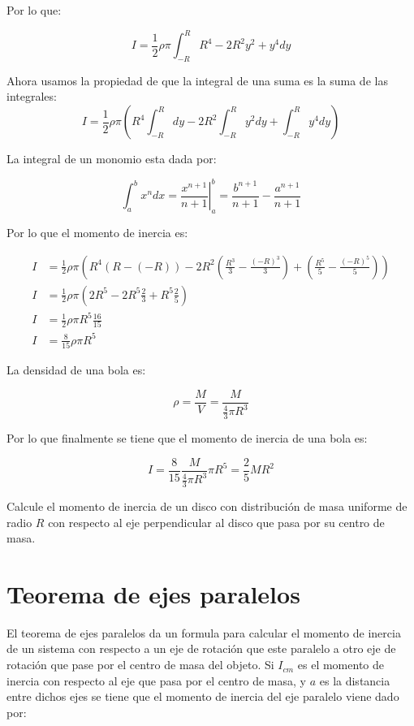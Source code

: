 \documentclass[a4paper,11pt]{article}
\theoremstyle{mytheor}
\begin{document}
Por lo que:

$$ I = \frac{1}{2} \rho \pi \int_{-R}^{R}  R^4 -2 R^2 y^2 + y^4   dy$$

Ahora usamos la propiedad de que la integral de una suma es la suma de las integrales:
$$ I = \frac{1}{2} \rho \pi \left(  R^4\int_{-R}^{R} dy -2 R^2 \int_{-R}^{R} y^2 dy + \int_{-R}^{R}y^4   dy\right)$$

La integral de un monomio esta dada por:

$$ \int_{a}^{b} x^{n} dx = \left.\frac{x^{n+1}}{n+1}\right|_{a}^{b} = \frac{b^{n+1}}{n+1} - \frac{a^{n+1}}{n+1}$$

Por lo que el momento de inercia es:

\begin{align*}
I &= \frac{1}{2} \rho \pi \left(  R^4(R-(-R))  -2 R^2 \left( \frac{R^3}{3}-\frac{(-R)^3}{3}\right)  + \left( \frac{R^5}{5}-\frac{(-R)^5}{5}\right)\right) \\
I  &=\frac{1}{2} \rho \pi \left(  2R^5 -2 R^5 \frac{2}{3}  + R^5 \frac{2}{5}\right)\\
I & = \frac{1}{2} \rho \pi R^5 \frac{16}{15}\\
I & = \frac{8}{15} \rho \pi R^5
\end{align*} 

La densidad de una bola es:

$$ \rho = \frac{M}{V} = \frac{M}{\frac{4}{3} \pi R^3}$$

Por lo que finalmente se tiene que el momento de inercia de una bola es:

$$ I= \frac{8}{15} \frac{M}{\frac{4}{3} \pi R^3} \pi R^5 =  \frac{2}{5} M R^2$$

Calcule el momento de inercia de un disco con distribución de masa uniforme de radio $R$ con respecto al eje perpendicular al disco que pasa por su centro de masa. 

\section{Teorema de ejes paralelos}

El teorema de ejes paralelos da un formula para calcular el momento de inercia de un sistema con respecto a un eje de rotación que este paralelo a otro eje de rotación que pase por el centro de masa del objeto. Si $I_{cm}$ es el momento de inercia con respecto al eje que pasa por el centro de masa, y $a$ es la distancia entre dichos ejes se tiene que el momento de inercia del eje paralelo viene dado por:
\end{document}
